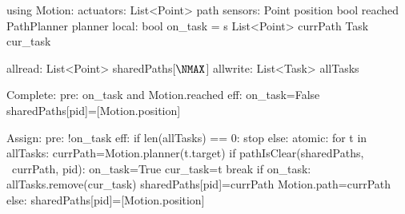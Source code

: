 using Motion:
  actuators:
    List<Point> path
  sensors:
    Point position
    bool reached
    PathPlanner planner
local:
  bool on_task = s
  List<Point> currPath
  Task cur_task

allread:
  List<Point> sharedPaths[$\NMAX$]
allwrite:
  List<Task> allTasks

Complete:
pre: on_task and Motion.reached
eff: on_task=False
sharedPaths[pid]=[Motion.position]

Assign:
  pre: !on_task
  eff:
     if len(allTasks) == 0:
        stop
     else: atomic:
        for t in allTasks:
           currPath=Motion.planner(t.target)
           if pathIsClear(sharedPaths, \
                             currPath, pid):
              on_task=True
              cur_task=t
              break
        if on_task:
           allTasks.remove(cur_task)
           sharedPaths[pid]=currPath
           Motion.path=currPath
        else:
           sharedPaths[pid]=[Motion.position]

